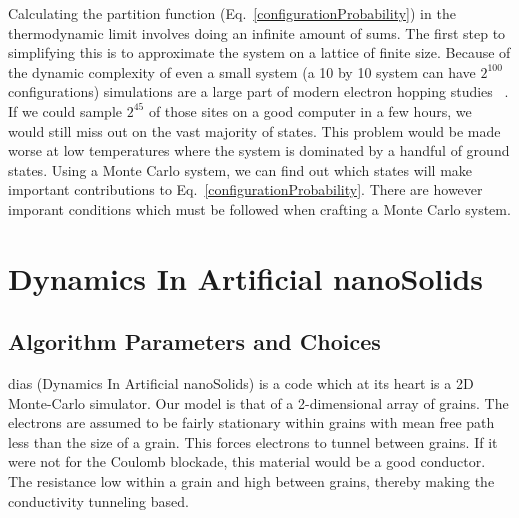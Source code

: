 	Calculating the partition function (Eq.~\ref{configurationProbability}) in the thermodynamic limit involves doing an infinite amount of sums. The first step to simplifying this is to approximate the system on a lattice of finite size. Because of the dynamic complexity of even a small system (a 10 by 10 system can have $2^{100}$ configurations) simulations are a large part of modern electron hopping studies ~\cite{kirkengen09}. If we could sample $2^{45}$ of those sites on a good computer in a few hours, we would still miss out on the vast majority of states. This problem would be made worse at low temperatures where the system is dominated by a handful of ground states. Using a Monte Carlo system, we can find out which states will make important contributions to Eq.~\ref{configurationProbability}. There are however imporant conditions which must be followed when crafting a Monte Carlo system.


\section{ Dynamics In Artificial nanoSolids }

\subsection{Algorithm Parameters and Choices}
{\sc dias} (Dynamics In Artificial nanoSolids) is a code which at its heart is a 2D Monte-Carlo simulator. Our model is that of a 2-dimensional array of grains. The electrons are assumed to be fairly stationary within grains with mean free path less than the size of a grain. This forces electrons to tunnel between grains. If it were not for the Coulomb blockade, this material would be a good conductor. The resistance low within a grain and high between grains, thereby making the conductivity tunneling based.  

